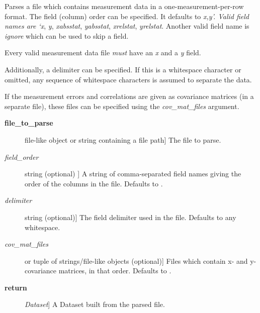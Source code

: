 \documentclass[a4paper,10pt,english]{sphinxmanual}
\begin{document}
\begin{fulllineitems}
\label{index:kafe.file_tools.parse_column_data}
Parses a file which contains measurement data in a one-measurement-per-row format.
The field (column) order can be specified. It defaults to \emph{x,y'. Valid field names are
{}`x}, \emph{y}, \emph{xabsstat}, \emph{yabsstat}, \emph{xrelstat}, \emph{yrelstat}. Another
valid field name is \emph{ignore} which can be used to skip a field.

Every valid measurement data file \emph{must} have an \emph{x} and a \emph{y} field.

Additionally, a delimiter can be specified. If this is a whitespace character or omitted, any
sequence of whitespace characters is assumed to separate the data.

If the measurement errors and correlations are given as covariance matrices (in a separate file),
these files can be specified using the \emph{cov\_mat\_files} argument.
\begin{description}
\item[{\textbf{file\_to\_parse}}] \leavevmode{[}file-like object or string containing a file path{]}
The file to parse.

\item[{\emph{field\_order}}] \leavevmode{[}string (optional) {]}
A string of comma-separated field names giving the order of the columns in the file. Defaults to .

\item[{\emph{delimiter}}] \leavevmode{[}string (optional){]}
The field delimiter used in the file. Defaults to any whitespace.

\item[{\emph{cov\_mat\_files}}] \leavevmode{[} or tuple of strings/file-like objects (optional){]}
Files which contain x- and y-covariance matrices, in that order. Defaults to .

\item[{\textbf{return}}] \leavevmode{[}\emph{Dataset}{]}
A Dataset built from the parsed file.

\end{description}

\end{fulllineitems}

\end{document}
